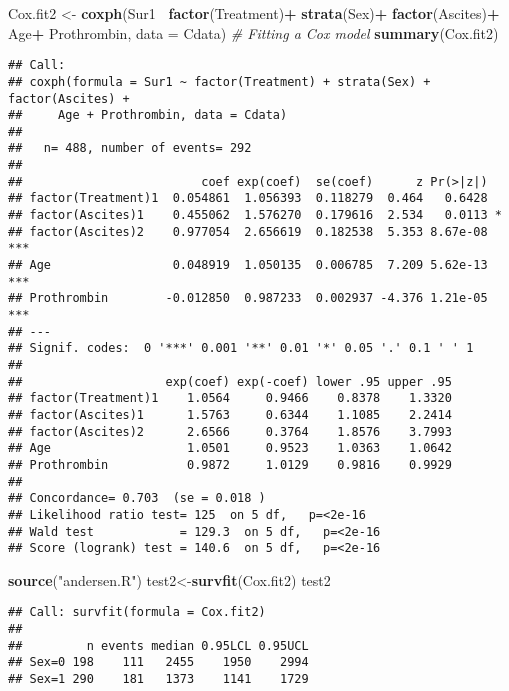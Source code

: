 \documentclass[
]{article}
\newenvironment{Shaded}{\begin{snugshade}}{\end{snugshade}}
\newcommand{\CommentTok}[1]{\textcolor[rgb]{0.56,0.35,0.01}{\textit{#1}}}
\newcommand{\DataTypeTok}[1]{\textcolor[rgb]{0.13,0.29,0.53}{#1}}
\newcommand{\KeywordTok}[1]{\textcolor[rgb]{0.13,0.29,0.53}{\textbf{#1}}}
\newcommand{\NormalTok}[1]{#1}
\newcommand{\OperatorTok}[1]{\textcolor[rgb]{0.81,0.36,0.00}{\textbf{#1}}}
\newcommand{\StringTok}[1]{\textcolor[rgb]{0.31,0.60,0.02}{#1}}
\begin{document}
\begin{Shaded}
\begin{Highlighting}[]
\NormalTok{Cox.fit2 <-}\StringTok{ }\KeywordTok{coxph}\NormalTok{(Sur1}\OperatorTok{~}\StringTok{ }\KeywordTok{factor}\NormalTok{(Treatment)}\OperatorTok{+}\StringTok{ }\KeywordTok{strata}\NormalTok{(Sex)}\OperatorTok{+}\StringTok{ }\KeywordTok{factor}\NormalTok{(Ascites)}\OperatorTok{+}\StringTok{ }\NormalTok{Age}\OperatorTok{+}\StringTok{ }\NormalTok{Prothrombin, }\DataTypeTok{data =}\NormalTok{ Cdata) }\CommentTok{# Fitting a Cox model}
\KeywordTok{summary}\NormalTok{(Cox.fit2)}
\end{Highlighting}
\end{Shaded}

\begin{verbatim}
## Call:
## coxph(formula = Sur1 ~ factor(Treatment) + strata(Sex) + factor(Ascites) + 
##     Age + Prothrombin, data = Cdata)
## 
##   n= 488, number of events= 292 
## 
##                         coef exp(coef)  se(coef)      z Pr(>|z|)    
## factor(Treatment)1  0.054861  1.056393  0.118279  0.464   0.6428    
## factor(Ascites)1    0.455062  1.576270  0.179616  2.534   0.0113 *  
## factor(Ascites)2    0.977054  2.656619  0.182538  5.353 8.67e-08 ***
## Age                 0.048919  1.050135  0.006785  7.209 5.62e-13 ***
## Prothrombin        -0.012850  0.987233  0.002937 -4.376 1.21e-05 ***
## ---
## Signif. codes:  0 '***' 0.001 '**' 0.01 '*' 0.05 '.' 0.1 ' ' 1
## 
##                    exp(coef) exp(-coef) lower .95 upper .95
## factor(Treatment)1    1.0564     0.9466    0.8378    1.3320
## factor(Ascites)1      1.5763     0.6344    1.1085    2.2414
## factor(Ascites)2      2.6566     0.3764    1.8576    3.7993
## Age                   1.0501     0.9523    1.0363    1.0642
## Prothrombin           0.9872     1.0129    0.9816    0.9929
## 
## Concordance= 0.703  (se = 0.018 )
## Likelihood ratio test= 125  on 5 df,   p=<2e-16
## Wald test            = 129.3  on 5 df,   p=<2e-16
## Score (logrank) test = 140.6  on 5 df,   p=<2e-16
\end{verbatim}

\begin{Shaded}
\begin{Highlighting}[]
\KeywordTok{source}\NormalTok{(}\StringTok{"andersen.R"}\NormalTok{)}
\NormalTok{test2<-}\KeywordTok{survfit}\NormalTok{(Cox.fit2)}
\NormalTok{test2}
\end{Highlighting}
\end{Shaded}

\begin{verbatim}
## Call: survfit(formula = Cox.fit2)
## 
##         n events median 0.95LCL 0.95UCL
## Sex=0 198    111   2455    1950    2994
## Sex=1 290    181   1373    1141    1729
\end{verbatim}
\end{document}
